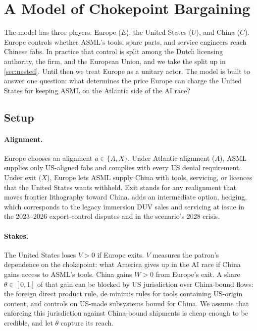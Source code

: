 \section{A Model of Chokepoint Bargaining}\label{sec:model}

The model has three players: Europe ($E$), the United States ($U$), and China ($C$). Europe controls whether ASML's tools, spare parts, and service engineers reach Chinese fabs. In practice that control is split among the Dutch licensing authority, the firm, and the European Union, and we take the split up in \cref{sec:nested}. Until then we treat Europe as a unitary actor. The model is built to answer one question: what determines the price Europe can charge the United States for keeping ASML on the Atlantic side of the AI race?

\subsection{Setup}\label{sec:setup}

\paragraph{Alignment.} Europe chooses an alignment $a \in \{A, X\}$. Under Atlantic alignment ($A$), ASML supplies only US-aligned fabs and complies with every US denial requirement. Under exit ($X$), Europe lets ASML supply China with tools, servicing, or licences that the United States wants withheld. Exit stands for any realignment that moves frontier lithography toward China.  adds an intermediate option, hedging, which corresponds to the legacy immersion DUV sales and servicing at issue in the 2023--2026 export-control disputes and in the scenario's 2028 crisis.

\paragraph{Stakes.} The United States loses $V>0$ if Europe exits. $V$ measures the patron's dependence on the chokepoint: what America gives up in the AI race if China gains access to ASML's tools. China gains $W>0$ from Europe's exit. A share $\theta \in [0,1]$ of that gain can be blocked by US jurisdiction over China-bound flows: the foreign direct product rule, de minimis rules for tools containing US-origin content, and controls on US-made subsystems bound for China. We assume that enforcing this jurisdiction against China-bound shipments is cheap enough to be credible, and let $\theta$ capture its reach.

